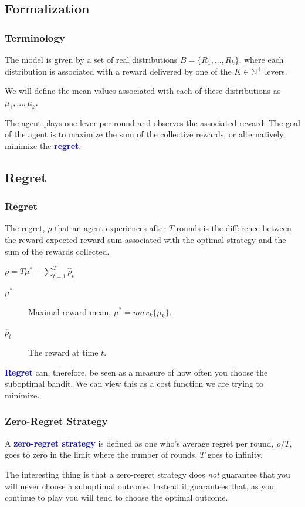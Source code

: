 \documentclass{beamer}
\begin{document}
\subsection{Formalization}
\begin{frame}
  \frametitle{Terminology}
  The model is given by a set of real distributions $ B = \{R_1,..., R_k\} $, where each distribution is associated with a reward delivered by one of the $ K \in \mathbb{N}^+$ levers. \vspace{3mm} \pause

  We will define the mean values associated with each of these distributions as $ \mu_1,..., \mu_k $. \vspace{3mm} \pause

  The agent plays one lever per round and observes the associated reward. The goal of the agent is to maximize the sum of the collective rewards, or alternatively, minimize the \textbf{\textcolor{blue}{regret}}.
\end{frame}

\subsection{Regret}
\begin{frame}
  \frametitle{Regret}
  The regret, $\rho$ that an agent experiences after $T$ rounds is the difference between the reward expected reward sum associated with the optimal strategy and the sum of the rewards collected.
  \begin{center}
    $\rho = T\mu^* - \sum\limits_{t=1}^{T}\hat{\rho}_t$
  \end{center}

  \begin{description}
    \item[$\mu^*$] Maximal reward mean, $\mu^* = max_k \{\mu_k\}$.
    \item[$\hat{\rho}_t$] The reward at time $t$.
  \end{description} \vspace{2mm} \pause

  \textbf{\textcolor{blue}{Regret}} can, therefore, be seen as a measure of how often you choose the suboptimal bandit. We can view this as a cost function we are trying to minimize.
\end{frame}

\begin{frame}
  \frametitle{Zero-Regret Strategy}
  A \textbf{\textcolor{blue}{zero-regret strategy}} is defined as one who's average regret per round, $\rho/T$, goes to zero in the limit where the number of rounds, $T$ goes to infinity. \vspace{6mm} \pause

  The interesting thing is that a zero-regret strategy does \textit{not} guarantee that you will never choose a suboptimal outcome. Instead it guarantees that, as you continue to play you will tend to choose the optimal outcome.
\end{frame}
\end{document}
